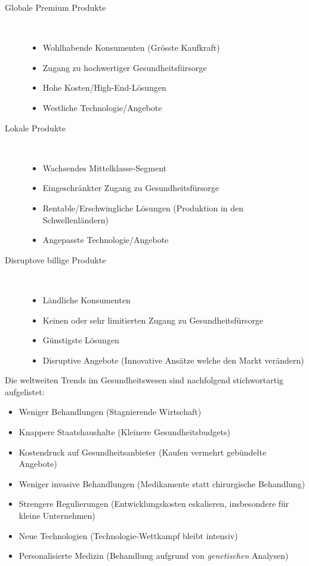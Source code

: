 \begin{description}
	\item[Globale Premium Produkte] \hfil \\ 
		\begin{itemize}
			\item Wohlhabende Konsumenten (Grösste Kaufkraft)
			\item Zugang zu hochwertiger Gesundheitsfürsorge
			\item Hohe Kosten/High-End-Lösungen
			\item Westliche Technologie/Angebote
		\end{itemize}
	\item[Lokale Produkte] \hfil \\ 
		\begin{itemize}
			\item Wachsendes Mittelklasse-Segment
			\item Eingeschränkter Zugang zu Gesundheitsfürsorge
			\item Rentable/Erschwingliche Lösungen (Produktion in den Schwellenländern)
			\item Angepasste Technologie/Angebote
		\end{itemize}
	\item[Disruptove billige Produkte] \hfil \\ 
		\begin{itemize}
			\item Ländliche Konsumenten
			\item Keinen oder sehr limitierten Zugang zu Gesundheitsfürsorge
			\item Günstigste Lösungen
			\item Disruptive Angebote (Innovative Ansätze welche den Markt verändern)
		\end{itemize}
\end{description}
Die weltweiten Trends im Gesundheitswesen sind nachfolgend stichwortartig aufgelistet:

\begin{itemize}
	\item Weniger Behandlungen (Stagnierende Wirtschaft)
	\item Knappere Staatshaushalte (Kleinere Gesundheitsbudgets)
	\item Kostendruck auf Gesundheitsanbieter (Kaufen vermehrt gebündelte Angebote)
	\item  Weniger invasive Behandlungen (Medikamente statt chirurgische Behandlung)
	\item Strengere Regulierungen (Entwicklungskosten eskalieren, insbesondere für kleine Unternehmen)
	\item Neue Technologien (Technologie-Wettkampf bleibt intensiv)
	\item Personalisierte Medizin (Behandlung aufgrund von \textit{genetischen} Analysen)
\end{itemize}

